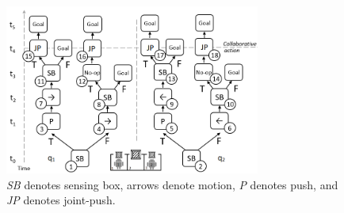 \documentclass[letterpaper]{article} %
\theoremstyle{definition}
\begin{document}
\begin{figure}[t]
\centering
\includegraphics[width=3.3in]{LocalTrees.png}
\caption{\emph{SB} denotes sensing box, arrows denote motion, {\em P} denotes push,
and \emph{JP} denotes joint-push. 
}
\label{fig:LocalTrees}
\end{figure}
\end{document}
